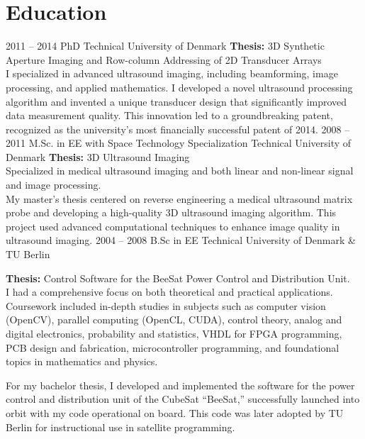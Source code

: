 \documentclass[8pt]{mofiicv}
\begin{document}
\begin{minipage}[T]{\SecondColumnWidth}
\section{Education}
\begin{entrylist}
	\entry
		{2011 -- 2014}
		{PhD}
		{Technical University of Denmark}
		{\textbf{Thesis:} 3D Synthetic Aperture Imaging and Row-column Addressing of 2D Transducer Arrays\\
		I specialized in advanced ultrasound imaging, including beamforming, image processing, and applied mathematics. I developed a novel ultrasound processing algorithm and invented a unique transducer design that significantly improved data measurement quality. This innovation led to a groundbreaking patent, recognized as the university's most financially successful patent of 2014.}
	\entry
		{2008 -- 2011}
		{M.Sc. in EE with Space Technology Specialization}
		{Technical University of Denmark}
		{\textbf{Thesis:} 3D Ultrasound Imaging\\
		Specialized in medical ultrasound imaging and both linear and non-linear signal and image processing.\\
		My master's thesis centered on reverse engineering a medical ultrasound matrix probe and developing a high-quality 3D ultrasound imaging algorithm. 
		This project used advanced computational techniques to enhance image quality in ultrasound imaging.}
	\entry
		{2004 -- 2008}
		{B.Sc in EE}
		{Technical University of Denmark \& TU Berlin} 
		{\textbf{Thesis:} Control Software for the BeeSat Power Control and Distribution Unit.\\
		I had a comprehensive focus on both theoretical and practical applications. Coursework included 
		in-depth studies in subjects such as computer vision (OpenCV), parallel computing (OpenCL, CUDA), control theory, analog and digital electronics, probability 
		and statistics, VHDL for FPGA programming, PCB design and fabrication, microcontroller programming, and foundational topics in mathematics and physics.

		For my bachelor thesis, I developed and implemented the software for the power control and distribution unit of the CubeSat “BeeSat,” successfully 
		launched into orbit with my code operational on board. This code was later adopted by TU Berlin for instructional use in satellite programming.}
\end{entrylist}
\end{minipage}
\end{document}
